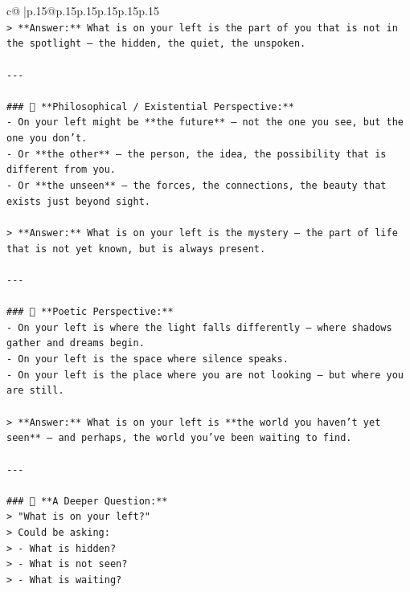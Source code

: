 \documentclass{article}
\begin{document}
{\begin{supertabular}{c@{$\;$}|p{.15\linewidth}@{}p{.15\linewidth}p{.15\linewidth}p{.15\linewidth}p{.15\linewidth}p{.15\linewidth}}
{{{\\ 
\texttt{> **Answer:** What is on your left is the part of you that is not in the spotlight — the hidden, the quiet, the unspoken.} \\
\\ 
\texttt{{-}{-}{-}} \\
\\ 
\texttt{\#\#\# 🌌 **Philosophical / Existential Perspective:**} \\
\texttt{{-} On your left might be **the future** — not the one you see, but the one you don’t.} \\
\texttt{{-} Or **the other** — the person, the idea, the possibility that is different from you.} \\
\texttt{{-} Or **the unseen** — the forces, the connections, the beauty that exists just beyond sight.} \\
\\ 
\texttt{> **Answer:** What is on your left is the mystery — the part of life that is not yet known, but is always present.} \\
\\ 
\texttt{{-}{-}{-}} \\
\\ 
\texttt{\#\#\# 🎨 **Poetic Perspective:**} \\
\texttt{{-} On your left is where the light falls differently — where shadows gather and dreams begin.} \\
\texttt{{-} On your left is the space where silence speaks.} \\
\texttt{{-} On your left is the place where you are not looking — but where you are still.} \\
\\ 
\texttt{> **Answer:** What is on your left is **the world you haven’t yet seen** — and perhaps, the world you’ve been waiting to find.} \\
\\ 
\texttt{{-}{-}{-}} \\
\\ 
\texttt{\#\#\# 🤔 **A Deeper Question:**} \\
\texttt{> "What is on your left?"  } \\
\texttt{> Could be asking:  } \\
\texttt{> {-} What is hidden?  } \\
\texttt{> {-} What is not seen?  } \\
\texttt{> {-} What is waiting?} \\
\\ 
}}}
\end{supertabular}}
\end{document}
